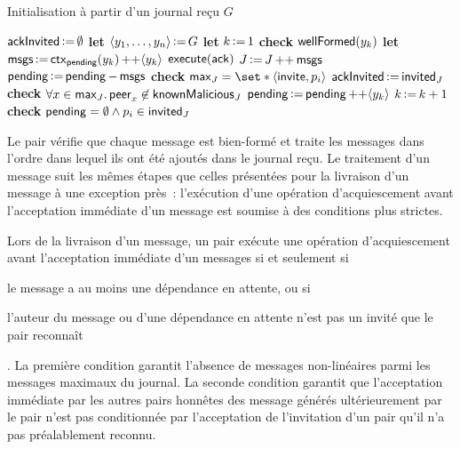 \begin{algorithm}[ht]
\caption[Initialisation à partir d'un journal reçu]{Initialisation à partir d'un journal reçu $G$}\label{alg:full-log-init}
\begin{algorithmic}[1]
    \State $\trm{ackInvited} \assign \emptyset$
    \State \textbf{let} $\tuple*{y_1, \dotsc, y_n} \assign G$
    \State \textbf{let} $k \assign 1$
        \State \textbf{check} $\trm{wellFormed}(y_k)$
            \State \textbf{let} $\trm{msgs} \assign \trm{ctx}_{\trm{pending}}(y_k) \lappend \tuple*{y_k}$
                \State $\trm{execute}(\trm{ack})$
            \EndIf
            \State $J \assign J \lappend \trm{msgs}$
            \State $\trm{pending} \assign \trm{pending} \sminus \trm{msgs}$
                \State \textbf{check} $\trm{max}_J = \set*{\tuple*{\trm{invite}, p_i}}$
                \State $\trm{ackInvited} \assign \trm{invited}_J$
            \EndIf
            \State \textbf{check} $\forall x \in \trm{max}_J \qsep \trm{peer}_x \not\in \trm{knownMalicious}_J$
        \Else
            \State $\trm{pending} \assign \trm{pending} \lappend \tuple*{y_k}$
        \EndIf
        \State $k \assign k + 1$
    \EndWhile
    \State \textbf{check} $\trm{pending} = \emptyset \land p_i \in \trm{invited}_J$
\EndProcedure
\end{algorithmic}
\end{algorithm}

Le pair vérifie que chaque message est bien-formé et traite les messages dans l'ordre dans lequel ils ont été ajoutés dans le journal reçu.
Le traitement d'un message suit les mêmes étapes que celles présentées pour la livraison d'un message à une exception près~: l'exécution d'une opération d'acquiescement avant l'acceptation immédiate d'un message est soumise à des conditions plus strictes.

Lors de la livraison d'un message, un pair exécute une opération d'acquiescement avant l'acceptation immédiate d'un messages si et seulement si \begin{inlinelist}
\item le message a au moins une dépendance en attente, ou si
\item l'auteur du message ou d'une dépendance en attente n'est pas un invité que le pair reconnaît
\end{inlinelist}.
La première condition garantit l'absence de messages non-linéaires parmi les messages maximaux du journal.
La seconde condition garantit que l'acceptation immédiate par les autres pairs honnêtes des message générés ultérieurement par le pair n'est pas conditionnée par l'acceptation de l'invitation d'un pair qu'il n'a pas préalablement reconnu.

